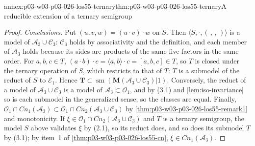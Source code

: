 \begin{annexitem}{annex:p03-w03-p03-026-los55-ternary}{thm:p03-w03-p03-026-los55-ternary}{A reducible extension of a ternary semigroup}
\begin{proof}
\emph{Conclusions.}  Put \((u,v,w)=(u\cdot v)\cdot w\) on \(S\).  Then
\(\langle S,\cdot,(\,,\,,\,)\rangle\) is a model of
\(\mathcal A_3\cup\mathcal C_3\): \(\mathcal C_3\) holds by associativity and
the definition, and each member of \(\mathcal A_3\) holds because its sides are
products of the same five factors in the same order.  For \(a,b,c\in T\),
\((a\cdot b)\cdot c=\langle a,b\rangle\cdot c=[a,b,c]\in T\), so \(T\) is closed
under the ternary operation of \(S\), which restricts to that of \(T\): \(T\)
is a submodel of the reduct of \(S\) to \(\mathcal E_1\).  Hence
\(\mathbf T\subset\operatorname{sm}(\mathbf M(\mathcal A_3\cup\mathcal C_3)|1)\).
Conversely, the reduct of a model of \(\mathcal A_3\cup\mathcal C_3\) is a
model of \(\mathcal A_3\subset\mathcal O_1\), and by (3.1) and
\cref{lem:iso-invariance} so is each submodel in the generalized sense; so the
classes are equal.  Finally,
\(\mathcal O_1\cap\mathit{Cn}_1(\mathcal A_3)\subset\mathcal O_1\cap\mathit{Cn}_2(\mathcal A_3\cup\mathcal C_3)\)
by \cref{thm:p03-w03-p03-026-los55-remark1} and monotonicity.  If
\(\xi\in\mathcal O_1\cap\mathit{Cn}_2(\mathcal A_3\cup\mathcal C_3)\) and \(T\)
is a ternary semigroup, the model \(S\) above validates \(\xi\) by (2.1), so
its reduct does, and so does its submodel \(T\) by (3.1); by item~1 of
\cref{thm:p03-w03-p03-026-los55-cn}, \(\xi\in\mathit{Cn}_1(\mathcal A_3)\).
\end{proof}
\end{annexitem}

